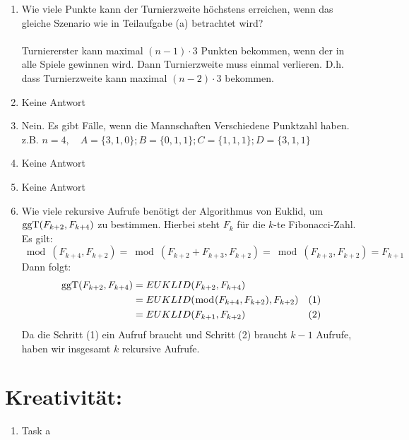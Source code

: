 \begin{enumerate}[label=(\alph*)]
        \item Wie viele Punkte kann der Turnierzweite höchstens erreichen, wenn das gleiche Szenario
		wie in Teilaufgabe (a) betrachtet wird? \\\\
		Turniererster kann maximal $(n-1)\cdot 3$ Punkten bekommen, wenn der in alle Spiele gewinnen 
		wird. Dann Turnierzweite muss einmal verlieren. D.h. dass Turnierzweite kann maximal 
		$(n-2)\cdot 3$ bekommen.
        
        \item Keine Antwort
        
        \item Nein. Es gibt F\"alle, wenn die Mannschaften Verschiedene Punktzahl haben. \\
        z.B. $n=4, \quad A=\{3,1,0\}; B=\{0,1,1\}; C=\{1,1,1\}; D= \{3,1,1 \}$
        
        \item Keine Antwort
        
        \item Keine Antwort
        
        \item Wie viele rekursive Aufrufe benötigt der Algorithmus von Euklid, um $\operatorname{ggT}(F_{k+2},F_{k+4})$
		zu bestimmen. Hierbei steht $F_k$ für die $k$-te Fibonacci-Zahl.
		Es gilt:
		\[\bmod(F_{k+4},F_{k+2}) = \bmod(F_{k+2} + F_{k+3},F_{k+2}) = \bmod(F_{k+3},F_{k+2}) = F_{k+1}\]
		Dann folgt:
		\begin{align*}
			\operatorname{ggT}(F_{k+2},F_{k+4}) &= EUKLID(F_{k+2},F_{k+4}) \\
			 &= EUKLID(\bmod(F_{k+4},F_{k+2}),F_{k+2}) &(1) \\ 
			 &= EUKLID(F_{k+1},F_{k+2}) &(2)
		\end{align*}
		Da die Schritt (1) ein Aufruf braucht und Schritt (2) braucht $k-1$ Aufrufe, haben wir insgesamt
		$k$ rekursive Aufrufe.

    \end{enumerate}
    \section*{Kreativität:}
    \begin{enumerate}[label=(\alph*)]
    	\item Task a
    \end{enumerate}

